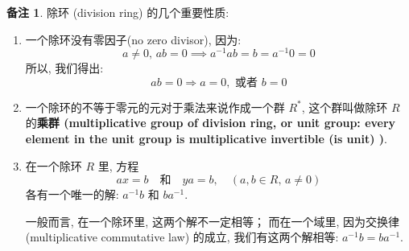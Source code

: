 \documentclass[utf8]{ctexbook}
\theoremstyle{definition}
\newtheorem{memo}{备注}[section]
\begin{document}
\begin{memo}\label{memo_division_ring_properties}
除环 (division ring) 的几个重要性质:

\begin{enumerate}
\item{一个除环没有零因子(no zero divisor), 因为:
\begin{equation}
a \neq 0, \, ab = 0 \implies a^{-1} ab = b = a^{-1} 0 = 0
\end{equation}
所以, 我们得出:
\begin{equation}
ab = 0 \Rightarrow a = 0, \mbox{  或者  } b = 0
\end{equation}
}
\item{一个除环的不等于零元的元对于乘法来说作成一个群 $R^*$, 这个群叫做除环 $R$ 的\textbf{乘群 (multiplicative group of division ring, or unit group: every element in the unit group is multiplicative invertible (is unit) )}.}
\item{在一个除环 $R$ 里, 方程
\begin{equation}
ax = b \quad \mbox{和} \quad ya = b, \quad (a, b \in R,\, a \neq 0 )
\end{equation}
各有一个唯一的解: $a^{-1}b$ 和 $b a^{-1}$.

一般而言, 在一个除环里, 这两个解不一定相等； 而在一个域里, 因为交换律(multiplicative commutative law) 的成立, 我们有这两个解相等: $a^{-1}b = b a^{-1}$.
}

\end{enumerate}
\end{memo}
\end{document}
